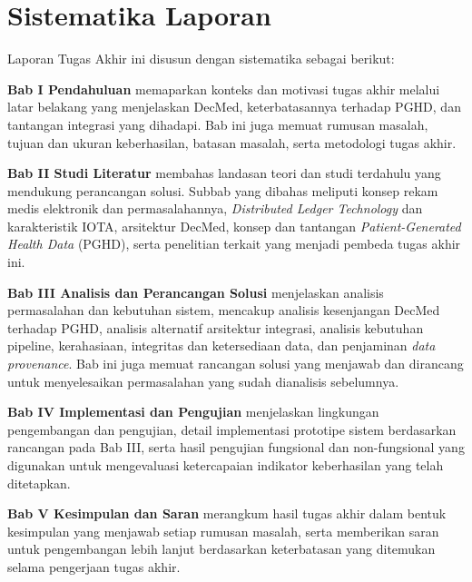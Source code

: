 \section{Sistematika Laporan}\label{sec:sistematika}

Laporan Tugas Akhir ini disusun dengan sistematika sebagai berikut:

\textbf{Bab I Pendahuluan} memaparkan konteks dan motivasi tugas akhir melalui latar belakang yang menjelaskan DecMed, keterbatasannya terhadap PGHD, dan tantangan integrasi yang dihadapi.
Bab ini juga memuat rumusan masalah, tujuan dan ukuran keberhasilan, batasan masalah, serta metodologi tugas akhir.

\textbf{Bab II Studi Literatur} membahas landasan teori dan studi terdahulu yang mendukung perancangan solusi. 
Subbab yang dibahas meliputi konsep rekam medis elektronik dan permasalahannya, \textit{Distributed Ledger Technology} dan karakteristik IOTA, arsitektur DecMed, konsep dan tantangan \textit{Patient-Generated Health Data} (PGHD), serta penelitian terkait yang menjadi pembeda tugas akhir ini.

\textbf{Bab III Analisis dan Perancangan Solusi} menjelaskan analisis permasalahan dan kebutuhan sistem, mencakup analisis kesenjangan DecMed terhadap PGHD, analisis alternatif arsitektur integrasi, analisis kebutuhan pipeline, kerahasiaan, integritas dan ketersediaan data, dan penjaminan \textit{data provenance}. 
Bab ini juga memuat rancangan solusi yang menjawab dan dirancang untuk menyelesaikan permasalahan yang sudah dianalisis sebelumnya.

\textbf{Bab IV Implementasi dan Pengujian} menjelaskan lingkungan pengembangan dan pengujian, detail implementasi prototipe sistem berdasarkan rancangan pada Bab III, serta hasil pengujian fungsional dan non-fungsional yang digunakan untuk mengevaluasi ketercapaian indikator keberhasilan yang telah ditetapkan.

\textbf{Bab V Kesimpulan dan Saran} merangkum hasil tugas akhir dalam bentuk kesimpulan yang menjawab setiap rumusan masalah, serta memberikan saran untuk pengembangan lebih lanjut berdasarkan keterbatasan yang ditemukan selama pengerjaan tugas akhir.